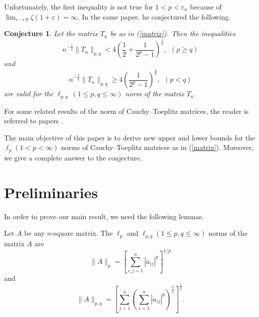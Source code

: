 \documentclass{amsart}
\newtheorem{conjecture}{Conjecture}
\begin{document}
Unfortunately, the first inequality is not true for $1<p<\varepsilon_n$  because of $\lim_{\varepsilon\to0}\zeta(1+\varepsilon)=\infty$. In the same paper, he conjectured the following. 
\begin{conjecture}
Let the matrix $T_n$ be as in (\ref{matrix}). Then the inequalities 
\begin{equation}\label{conj1}
n^{-\frac{1}{q}}\|T_n\|_{p,q}<4\left(\frac{1}{2}+\frac{1}{2^p-1}\right)^{\frac{1}{p}},~~(p\geq q)
\end{equation}
and 
\begin{equation}\label{conj2}
n^{-\frac{1}{q}}\|T_n\|_{p,q}\geq4\left(\frac{1}{2^p-1}\right)^{\frac{1}{p}},~~(p<q)
\end{equation}
are valid for the $\ell_{p,q}~(1\leq p,q\leq\infty)$ norm of the matrix $T_n$.
\end{conjecture}
For some related results of the norm of Cauchy--Toeplitz matrices, the reader is referred to papers \cite{gungor, bozkurt2, solak, bozkurt3,wu}.

The main objective of this paper is to derive new upper and lower bounds for the $\ell_p (1<p<\infty)$ norms of  Cauchy--Toeplitz matrices as in (\ref{matrix}). Moreover, we give a complete answer to the conjecture.
\section{Preliminaries}
In order to prove our main result, we need the following lemmas.

Let $A$ be any $n$-square matrix. The $\ell_p$ and $\ell_{p, q}(1 \leq p, q \leq \infty)$ norms of the matrix $A$ are
$$
\|A\|_p=\left[\sum_{i, j=1}^n\left|a_{i j}\right|^p\right]^{1 / p}
$$
and
$$
\|A\|_{p, q}=\left[\sum_{j=1}^n\left(\sum_{i=1}^n\left|a_{i j}\right|^p\right)^{\frac{q}{p}}\right]^{\frac{1}{q}}.
$$
\end{document}
